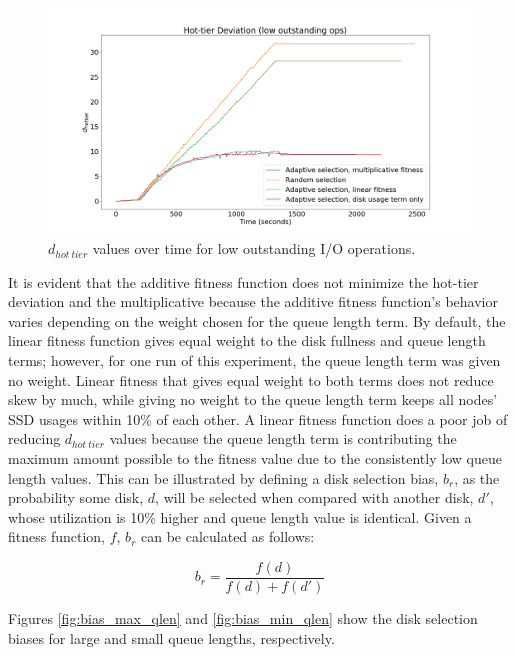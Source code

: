 \documentclass[12pt]{article}
\begin{document}
    \begin{figure}[htbp]
      \centering
      \includegraphics[scale=0.32]{images/low_outstanding_exp.png} 
      \caption{$d_{hot\ tier}$ values over time for low outstanding I/O
               operations.}
      \label{fig:low_outstanding_tier_disparity}
    \end{figure}

    \FloatBarrier

    It is evident that the additive fitness function does not minimize the
    hot-tier deviation and the multiplicative because the additive fitness
    function's behavior varies depending on the weight chosen for the queue
    length term. By default, the linear fitness function
    gives equal weight to the disk fullness and queue length terms;
    however, for one run of this experiment, the queue length term was given no
    weight. Linear fitness that gives equal weight to both terms does not
    reduce skew by much, while giving no weight to the queue length term
    keeps all nodes' SSD usages within 10\% of each other. A linear fitness
    function does a poor job of reducing $d_{hot\ tier}$ values because the
    queue length term is contributing the maximum amount possible to the
    fitness value due to the consistently low queue length values. This can be
    illustrated by defining a disk selection bias, $b_r$, as the probability
    some disk, $d$, will be selected when compared with another disk, $d'$,
    whose utilization is 10\% higher and queue length value is identical. Given
    a fitness function, $f$, $b_r$ can be calculated as follows:

    \begin{equation}
      b_r = \frac{f(d)}{f(d) + f(d')}
    \end{equation}

    Figures \ref{fig:bias_max_qlen} and \ref{fig:bias_min_qlen} show the disk
    selection biases for large and small queue lengths, respectively.
\end{document}
